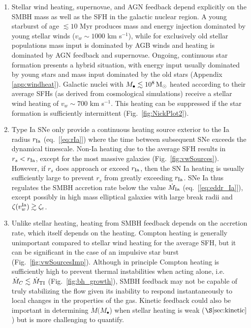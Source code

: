 \documentclass[usenatbib,fleqn]{mn2e}
\newcommand{\rs}{r_s}
\newcommand{\Mbh}[1][]{M_{\bullet#1}}
\newcommand{\rIa}{r_{\rm Ia}}
\begin{document}
\begin{enumerate}
  \item Stellar wind heating, supernovae, and AGN feedback depend
    explicitly on the SMBH mass as well as the SFH in the galactic
    nuclear region.  A young starburst of age $\lesssim 10$ Myr
    produces mass and energy injection dominated by young stellar
    winds ($v_w \sim 1000$ km s$^{-1}$), while for exclusively old
    stellar populations mass input is dominated by AGB winds and
    heating is dominated by AGN feedback and supernovae.  Ongoing,
    continuous star formation presents a hybrid situation, with energy
    input usually dominated by young stars and mass input dominated by
    the old stars (Appendix \ref{app:windheat}).  Galactic nuclei with
    $\Mbh \lesssim 10^8\Msun$ heated according to their average SFHs
    (as derived from cosmological simulations) receive a stellar wind
    heating of $v_w \sim 700$ km s$^{-1}$.  This heating can be
    suppressed if the star formation is sufficiently intermittent
    (Fig.~\ref{fig:NickPlot2}).

\item Type Ia SNe only provide a continuous heating source exterior to
  the Ia radius $\rIa$ (eq.~[\ref{eq:rIa}]) where the time between
  subsequent SNe exceeds the dynamical timescale.  Non-Ia heating due
  to the average SFH results in $\rs <\rIa$, except for the most
  massive galaxies (Fig.~\ref{fig:vwSources}).  However, if $\rs$ does
  approach or exceed $\rIa$, then the SN Ia heating is usually
  sufficiently large to prevent $\rs$ from greatly exceeding $\rIa$.
  SNe Ia thus regulates the SMBH accretion rate below the value
  $\dot{M}_{\rm Ia}$ (eq.~[\ref{eq:eddr_Ia}]), except possibly in high
  mass elliptical galaxies with large break radii and $\zeta(v_w^{\rm
    Ia}) \gtrsim \zeta_c$.

\item Unlike stellar heating, heating from SMBH feedback depends on
  the accretion rate, which itself depends on the heating.  Compton
  heating is generally unimportant compared to stellar wind heating
  for the average SFH, but it can be significant in the case of an impulsive
  star burst (Fig.~\ref{fig:vwSourcesImp}).  Although in principle
  Compton heating is sufficiently high to prevent thermal
  instabilities when acting alone, i.e. $\dot{M}_{C} \lesssim
  \dot{M}_{\rm TI}$ (Fig.~\ref{fig:bh_growth}), SMBH feedback may not
  be capable of truly stabilizing the flow given its inability
  to respond instantaneously to local changes in the properties of the
  gas.  Kinetic feedback could also be important in determining
  $\dot{M}(M_{\bullet}$) when stellar heating is weak
  ($\S\ref{sec:kinetic}$) but is more challenging to quantify.


\end{enumerate}
\end{document}
